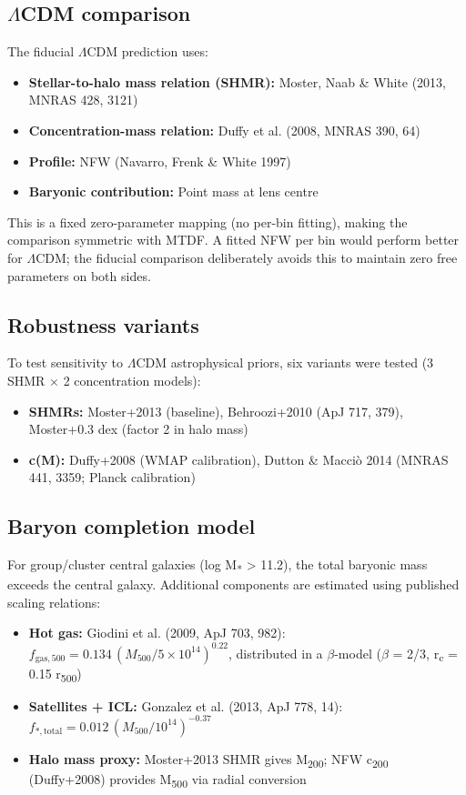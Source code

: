 \documentclass[11pt,a4paper]{article}
\begin{document}
\subsection{$\Lambda$CDM comparison}
The fiducial $\Lambda$CDM prediction uses:

\begin{itemize}
  \item \textbf{Stellar-to-halo mass relation (SHMR):} Moster, Naab \& White (2013, MNRAS 428, 3121)
  \item \textbf{Concentration-mass relation:} Duffy et al. (2008, MNRAS 390, 64)
  \item \textbf{Profile:} NFW (Navarro, Frenk \& White 1997)
  \item \textbf{Baryonic contribution:} Point mass at lens centre
\end{itemize}

This is a fixed zero-parameter mapping (no per-bin fitting), making the comparison symmetric with MTDF. A fitted NFW per bin would perform better for $\Lambda$CDM; the fiducial comparison deliberately avoids this to maintain zero free parameters on both sides.

\subsection{Robustness variants}
To test sensitivity to $\Lambda$CDM astrophysical priors, six variants were tested (3 SHMR $\times$ 2 concentration models):

\begin{itemize}
  \item \textbf{SHMRs:} Moster+2013 (baseline), Behroozi+2010 (ApJ 717, 379), Moster+0.3 dex (factor 2 in halo mass)
  \item \textbf{c(M):} Duffy+2008 (WMAP calibration), Dutton \& Macci\`o 2014 (MNRAS 441, 3359; Planck calibration)
\end{itemize}

\subsection{Baryon completion model}
For group/\allowbreak{}cluster central galaxies (log M\textsubscript{*} > 11.2), the total baryonic mass exceeds the central galaxy. Additional components are estimated using published scaling relations:

\begin{itemize}
  \item \textbf{Hot gas:} Giodini et al. (2009, ApJ 703, 982): \(f_{\mathrm{gas},500} = 0.134\,(M_{500}/5\times10^{14})^{0.22}\), distributed in a $\beta$-model ($\beta$ = 2/\allowbreak{}3, r\textsubscript{c} = 0.15 r\textsubscript{500})
  \item \textbf{Satellites + ICL:} Gonzalez et al. (2013, ApJ 778, 14): \(f_{*,\mathrm{total}} = 0.012\,(M_{500}/10^{14})^{-0.37}\)
  \item \textbf{Halo mass proxy:} Moster+2013 SHMR gives M\textsubscript{200}; NFW c\textsubscript{200} (Duffy+2008) provides M\textsubscript{500} via radial conversion
\end{itemize}
\end{document}
